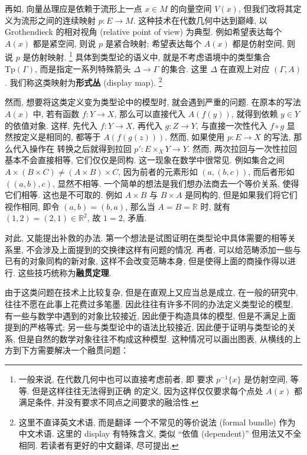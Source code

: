 再如, 向量丛理应是依赖于流形上一点 \(x \in M\) 的向量空间 \(V(x)\),
但我们改将其定义为流形之间的连续映射 \(p : E \to M\).
这种技术在代数几何中达到巅峰, 以 Grothendieck 的相对视角
(relative point of view) 为典型.
例如希望表达每个 \(A(x)\) 都是紧空间, 则说 \(p\) 是紧合映射;
希望表达每个 \(A(x)\) 都是仿射空间, 则说 \(p\) 是仿射映射.%
\footnote{一般来说, 在代数几何中也可以直接考虑前者, 即
要求 \(p^{-1}\{x\}\) 是仿射空间, 等等. 但是这样往往无法得到正确
的定义, 因为这样仅仅要求每个点处 \(A(x)\) 都满足条件,
并没有要求不同点之间要求的融洽性.}
具体到类型论的语义中, 就是不考虑语境中的类型集合 \(\mathrm{Tp}(\Gamma)\),
而是指定一系列特殊箭头 \(\Delta \to \Gamma\) 的集合.
这里 \(\Delta\) 在直观上对应 \((\Gamma, A)\).
我们称这类映射为\textbf{形式丛} (display map).%
\footnote{这里不直译英文术语, 而是翻译
一个不常见的等价说法 (formal bundle) 作为中文术语.
这里的 display 有特殊含义, 类似 “依值 (dependent)”
但用法又不全相同. 若读者有更好的中文翻译, 尽可提出.}

然而, 想要将这类定义变为类型论中的模型时, 就会遇到严重的问题.
在原本的写法 \(A(x)\) 中, 若有函数 \(f : Y \to X\),
那么可以直接代入 \(A(f(y))\), 就得到依赖 \(y \in Y\) 的依值对象.
这样, 先代入 \(f : Y \to X\), 再代入 \(g : Z \to Y\),
与直接一次性代入 \(f \circ g\) 显然按定义是相同的,
都等于 \(A(f(g(z)))\).
然而, 如果使用 \(p : E \to X\) 的写法, 那么代入操作在
转换之后就得到拉回 \(p' : E \times_X Y \to Y\).
然而, 两次拉回与一次性拉回基本不会直接相等, 它们仅仅是同构.
这一现象在数学中很常见. 例如集合之间
\(A \times (B \times C) \ne (A \times B) \times C\),
因为前者的元素形如 \((a, (b, c))\), 而后者形如
\(((a, b), c)\), 显然不相等.
一个简单的想法是我们想办法商去一个等价关系, 使得它们相等.
这也是不可取的. 例如 \(A \times B\) 与 \(B \times A\) 是同构的,
但是如果我们将它们视作相同, 即令 \((a, b) = (b, a)\),
那么当 \(A = B = \mathbb{R}\) 时,
就有 \((1, 2) = (2, 1) \in \mathbb{R}^2\), 故 \(1 = 2\), 矛盾.

对此, 又能提出补救的办法.
第一个想法是试图证明在类型论中具体需要的相等关系里,
不会涉及上面提到的交换律这样有问题的情况.
再者, 可以给范畴添加一些与已有的对象同构的新对象,
这样不会改变范畴本身, 但是使得上面的商操作得以进行.
这些技巧统称为\textbf{融贯定理}.

由于这类问题在技术上比较复杂, 但是在直观上又应当总是成立,
在一般的研究中, 往往不愿在此事上花费过多笔墨.
因此往往有许多不同的办法定义类型论的模型,
有一些与数学中遇到的对象比较接近, 因此便于构造具体的模型,
但是不满足上面提到的严格等式;
另一些与类型论中的语法比较接近, 因此便于证明与类型论的关系,
但是自然的数学对象往往不构成这种模型.
这种情况可以画出图表, 从横线的上方到下方需要解决一个融贯问题：

